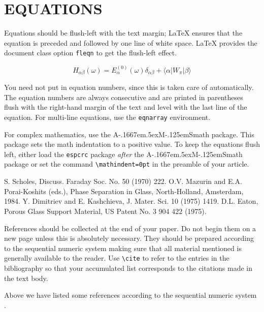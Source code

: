 \documentclass[fleqn,12pt,twoside]{article}
\newcommand{\AmS}{{\protect\the\textfont2
  A\kern-.1667em\lower.5ex\hbox{M}\kern-.125emS}}
\begin{document}
\section{EQUATIONS}

Equations should be flush-left with the text margin; \LaTeX{} ensures
that the equation is preceded and followed by one line of white space.
\LaTeX{} provides the document class option {\tt fleqn} to get the
flush-left effect.

\begin{equation}
H_{\alpha\beta}(\omega) = E_\alpha^{(0)}(\omega) \delta_{\alpha\beta} +
                          \langle \alpha | W_\pi | \beta \rangle 
\end{equation}

You need not put in equation numbers, since this is taken care of
automatically. The equation numbers are always consecutive and are
printed in parentheses flush with the right-hand margin of the text and
level with the last line of the equation. For multi-line equations, use
the {\tt eqnarray} environment.

For complex mathematics, use the \AmS math package. This package
sets the math indentation to a positive value. To keep the equations
flush left, either load the \texttt{espcrc} package \emph{after} the
\AmS math package or set the command \verb|\mathindent=0pt| in the
preamble of your article.

\begin{thebibliography}{9}
 S. Scholes, Discuss. Faraday Soc. No. 50 (1970) 222.
 O.V. Mazurin and E.A. Porai-Koshits (eds.),
                 Phase Separation in Glass, North-Holland, Amsterdam, 1984.
 Y. Dimitriev and E. Kashchieva, 
                 J. Mater. Sci. 10 (1975) 1419.
 D.L. Eaton, Porous Glass Support Material,
                 US Patent No. 3 904 422 (1975).
\end{thebibliography}

References should be collected at the end of your paper. Do not begin
them on a new page unless this is absolutely necessary. They should be
prepared according to the sequential numeric system making sure that
all material mentioned is generally available to the reader. Use
\verb+\cite+ to refer to the entries in the bibliography so that your
accumulated list corresponds to the citations made in the text body. 

Above we have listed some references according to the
sequential numeric system \cite{Scho70,Mazu84,Dimi75,Eato75}.
\end{document}

